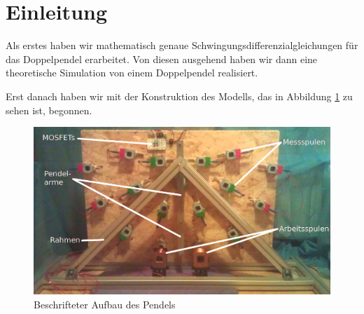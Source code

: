 \documentclass[a4paper, 10pt]{article}
\title{\mytitle}
\author{\myauthor}
\begin{document}
\maketitle
\begin{abstract}
In unserem Projekt beschäftigen wir uns mit dem Verhalten von einem chaotischen Doppelpendel. Wir wollen aus der aktuellen Bewegung eines Doppelpendels den weiteren Bewegungsablauf in einem kurzen Zeitintervall extrapolieren und dann versuchen, diese Bewegung zu beeinflussen.

Hierzu haben wir zunächst ein Doppelpendel konstruiert, bei dem durch Induktionsspulen Daten über den aktuellen Bewegungszustand erfasst werden können. Diese Daten werden in Echtzeit von einem Computer ausgewertet, um laufend eine Prognose an die Messwerte anzupassen. Anhand dieser Prognose kann entschieden werden, ob das Pendel eine unerwünschte Bewegung durchführen wird, und wenn nötig, kann mithilfe mehrerer Spulen eine korrigierende magnetische Kraft erzeugt werden. Es könnte zum Beispiel erwünscht sein, einen Überschlag zu vermeiden, oder die Energie des Systems zu kontrollieren.
\end{abstract}
\thispagestyle{empty}
\pagestyle{empty}

\clearpage
\tableofcontents

\clearpage
\setcounter{page}{1}
\pagestyle{fancy}

\section{Einleitung}
Als erstes haben wir mathematisch genaue Schwingungsdifferenzialgleichungen für das Doppelpendel erarbeitet.
Von diesen ausgehend haben wir dann eine theoretische Simulation von einem Doppelpendel realisiert.

Erst danach haben wir mit der Konstruktion des Modells, das in Abbildung \ref{fig:aufbaubeschriftet} zu sehen ist, begonnen.

\begin{figure}[bht]
  \includegraphics[width=\textwidth]{images/real_front_text_white.jpg}
  \caption{Beschrifteter Aufbau des Pendels}
  \label{fig:aufbaubeschriftet}
\end{figure}
\end{document}
